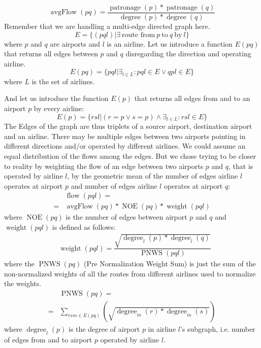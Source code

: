 \documentclass[twocolumn]{tum-article}
\DeclareMathOperator{\avgFlow}{avgFlow}
\DeclareMathOperator{\patronage}{patronage}
\DeclareMathOperator{\flow}{flow}
\DeclareMathOperator{\weight}{weight}
\DeclareMathOperator{\PNWS}{PNWS}
\DeclareMathOperator{\NOE}{NOE}
\DeclareMathOperator{\degree}{degree}
\begin{document}
\begin{equation}
\avgFlow(pq) = \dfrac{\patronage(p) * \patronage(q)}{\degree(p) * \degree(q)}
\end{equation}
Remember that we are handling a multi-edge directed graph here. 
\begin{equation}
E = \{(pql) | \exists\ \text{route from}\ p\ \text{to}\ q\ \text{by}\ l\}
\end{equation}
where $p$ and $q$ are airports and $l$ is an airline.
Let us introduce a function $E(pq)$ that returns all edges between $p$ and $q$ disregarding the direction and operating airline. 
\begin{equation}
E(pq) = \{pql | \exists_{l \in L}:pql \in E \lor qpl \in E\}
\end{equation}
where $L$ is the set of airlines.

And let us introduce the function $E(p)$ that returns all edges from and to an airport $p$ by every airline: 
\begin{equation}
E(p) = \{rsl | (r=p \lor s=p) \land \exists_{l \in L}:rsl \in E \}
\end{equation}
The Edges of the graph are thus triplets of a source airport, destination airport and an airline.
There may be multiple edges between two airports pointing in different directions and/or operated by different airlines.
We could assume an equal distribution of the flows among the edges. But we chose trying to be closer to reality by weighting the flow of an edge between two airports $p$ and $q$, that is operated by airline $l$, by the geometric mean of the number of edges airline $l$ operates at airport $p$ and number of edges airline $l$ operates at airport $q$: 
\begin{equation}
\begin{aligned}
&\flow(pql) =\\
={}&\avgFlow(pq)  
* \NOE(pq) 
* \weight(pql) 
\end{aligned}
\end{equation}
where $\NOE(pq)$ is the number of edges between airport $p$ and $q$ and $\weight(pql)$ is defined as follows: 
\begin{equation}
\begin{aligned}
&\weight(pql) = \dfrac{\sqrt{\degree_{l}(p) * \degree_{l}(q)}}{\PNWS(pql)}
\end{aligned}
\end{equation}
where the $\PNWS(pq)$ (Pre Normalization Weight Sum) is just the sum of the non-normalized weights of all the routes from different airlines used to normalize the weights. 
\begin{equation}
\begin{aligned}
&\PNWS(pq) = \\
={}&\displaystyle\sum_{rsm \in E(pq)}(\sqrt{\degree_{m}(r) * \degree_{m}(s)})
\end{aligned}
\end{equation}
where $\degree_l(p)$ is the degree of airport $p$ in airline $l$'s subgraph, i.e. number of edges from and to airport $p$ operated by airline $l$.
\end{document}
